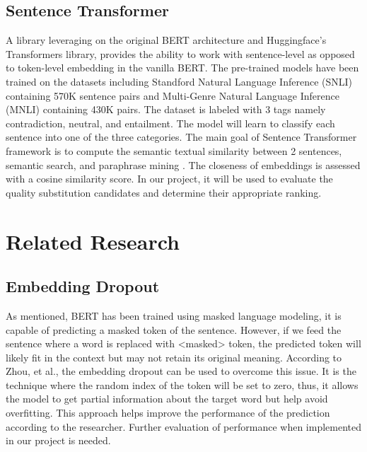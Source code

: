 \documentclass[12pt,oneside,openright,a4paper]{cpe-english-project}
\begin{document}
\subsection{Sentence Transformer} 
A library leveraging on the original BERT architecture and Huggingface’s Transformers library, provides the ability to work with sentence-level as opposed to token-level embedding in the vanilla BERT. The pre-trained models have been trained on the datasets including Standford Natural Language Inference (SNLI) containing 570K sentence pairs and Multi-Genre Natural Language Inference (MNLI) containing 430K pairs. The dataset is labeled with 3 tags namely contradiction, neutral, and entailment. The model will learn to classify each sentence into one of the three categories. The main goal of Sentence Transformer framework is to compute the semantic textual similarity between 2 sentences, semantic search, and paraphrase mining \cite{z}. The closeness of embeddings is assessed with a cosine similarity score. In our project, it will be used to evaluate the quality substitution candidates and determine their appropriate ranking.

\section{Related Research}
\subsection{Embedding Dropout}
As mentioned, BERT has been trained using masked language modeling, it is capable of predicting a masked token of the sentence. However, if we feed the sentence where a word is replaced with <masked> token, the predicted token will likely fit in the context but may not retain its original meaning. According to Zhou, et al.\cite{k}\cite{o}, the embedding dropout can be used to overcome this issue. It is the technique where the random index of the token will be set to zero, thus, it allows the model to get partial information about the target word but help avoid overfitting. This approach helps improve the performance of the prediction according to the researcher. Further evaluation of performance when implemented in our project is needed.
\end{document}
